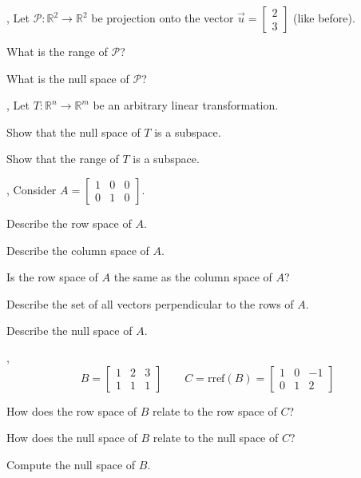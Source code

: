 \documentclass[letter]{article}
\newcommand{\R}{\mathbb{R}}
\newcommand{\rref}{\mathrm{rref}}
\newcommand{\mat}[1]{\begin{bmatrix}#1\end{bmatrix}}
\renewcommand{\emph}[1]{{\color{defcolor} \textbf{\textit{##1}}}}
\begin{document}
\sep
Let $\mathcal P:\R^2\to\R^2$ be projection onto the vector $\vec u=\mat{2\\3}$ (like before).
\begin{Enum}
	\item What is the range of $\mathcal P$?
	\item What is the null space of $\mathcal P$?
\end{Enum}

\sep
Let $T:\R^n\to\R^m$ be an arbitrary linear transformation.
\begin{Enum}
	\item Show that the null space of $T$ is a subspace.
	\item Show that the range of $T$ is a subspace.
\end{Enum}


\vspace{-.8cm}

\sep
Consider $A=\mat{1&0&0\\0&1&0}$.
\begin{Enum}
	\item Describe the row space of $A$.
	\item Describe the column space of $A$.
	\item Is the row space of $A$ the same as the column space of $A$?
	\item Describe the set of all vectors perpendicular to the rows of $A$.
	\item Describe the null space of $A$.
\end{Enum}

\sep
\vspace{-.5cm}
\[
	B=\mat{1&2&3\\1&1&1}\qquad C=\rref(B)=\mat{1&0&-1\\0&1&2}
\]
\begin{Enum}
	\item How does the row space of $B$ relate to the row space of $C$?
	\item How does the null space of $B$ relate to the null space of $C$?
	\item Compute the null space of $B$.
\end{Enum}
\end{document}
